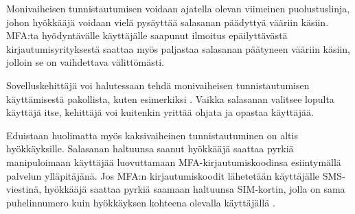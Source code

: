 Monivaiheisen tunnistautumisen voidaan ajatella olevan viimeinen puolustuslinja, johon hyökkääjä voidaan vielä pysäyttää salasanan päädyttyä vääriin käsiin. MFA:ta hyödyntävälle käyttäjälle saapunut ilmoitus epäilyttävästä kirjautumisyrityksestä saattaa myös paljastaa salasanan päätyneen vääriin käsiin, jolloin se on vaihdettava välittömästi.

Sovelluskehittäjä voi halutessaan tehdä monivaiheisen tunnistautumisen käyttämisestä pakollista, kuten esimerkiksi \citet{github_2fa_2023}. Vaikka salasanan valitsee lopulta käyttäjä itse, kehittäjä voi kuitenkin yrittää ohjata ja opastaa käyttäjää.

Eduistaan huolimatta myös kaksivaiheinen tunnistautuminen on altis hyökkäyksille. Salasanan haltuunsa saanut hyökkääjä saattaa pyrkiä manipuloimaan käyttäjää luovuttamaan MFA-kirjautumiskoodinsa esiintymällä palvelun ylläpitäjänä. Jos MFA:n kirjautumiskoodit lähetetään käyttäjälle SMS-viestinä, hyökkääjä saattaa pyrkiä saamaan haltuunsa SIM-kortin, jolla on sama puhelinnumero kuin hyökkäyksen kohteena olevalla käyttäjällä \citep{hess_vulnerabilities_2021}.
